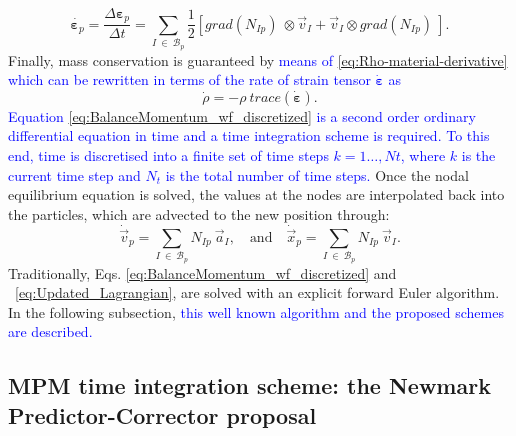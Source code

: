 \documentclass[preprint,12pt,a4paper]{elsarticle}
\newcommand{\tens}[1]{
  \ensuremath{\mathbf{{#1}}}
}
\newcommand\Grad[1]{grad({#1})}
\begin{document}
\begin{equation}
  \label{eq:IncrStrainPoint}
  \dot{\tens{\varepsilon}_{p}} = \frac{\Delta
    \tens{\varepsilon}_{p}}{\Delta t} = \sum_{I\ \in\ \mathcal{B}_p}
  \frac{1}{2} \left[\Grad{N_{Ip}}\ \otimes \vec{v}_{I} + \vec{v}_{I} \otimes
    \Grad{N_{Ip}}\ \right].
\end{equation}
Finally, mass conservation is guaranteed by \textcolor{blue}{means of \eqref{eq:Rho-material-derivative} which can be rewritten in terms of the rate of strain tensor $\dot{\tens{\varepsilon}}$ as}
\begin{equation}
  \label{eq:MassConservation}
\dot{\rho} = - \rho\ \mathit{trace} \left( \dot{\tens{\varepsilon}} \right).
\end{equation}
\textcolor{blue}{Equation \eqref{eq:BalanceMomentum_wf_discretized} is a second order ordinary differential equation in time and a time integration scheme is required.} \textcolor{blue}{To this end, time is discretised into a finite set of time steps $k = 1\ldots ,Nt$, where $k$ is the current time step and $N_t$ is the total number of time steps.} Once the nodal equilibrium equation is solved, the values at the nodes are interpolated back into the particles, which are advected
to the new position through:
\begin{equation}
  \label{eq:Updated_Lagrangian}
  \dot{\vec{v}}_p = \sum_{I\ \in\ \mathcal{B}_p} N_{Ip}\ \vec{a}_{I},\quad \text{and} \quad
  \dot{\vec{x}}_{p} = \sum_{I\ \in\ \mathcal{B}_p} N_{Ip}\ \vec{v}_{I}.  
\end{equation}
Traditionally, Eqs. \eqref{eq:BalanceMomentum_wf_discretized} and ~\eqref{eq:Updated_Lagrangian},
are solved with an explicit forward Euler algorithm. In the following subsection, \textcolor{blue}{this well known algorithm and the proposed schemes are described.}

\subsection{MPM time integration scheme: the Newmark Predictor-Corrector proposal}
\label{sec:epc-algor-mpm}
\end{document}
